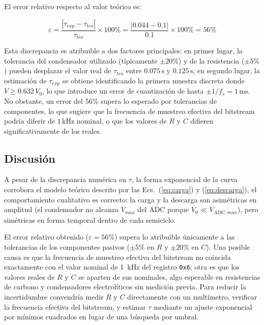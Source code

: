 \documentclass[conference]{IEEEtran}
\begin{document}
El error relativo respecto al valor teórico es:

\begin{equation}
    \varepsilon = \frac{|\tau_{exp} - \tau_{teo}|}{\tau_{teo}} \times 100\%
                = \frac{|0.044 - 0.1|}{0.1} \times 100\% = 56\%
    \label{eq:error}
\end{equation}

Esta discrepancia es atribuible a dos factores principales: en primer
lugar, la tolerancia del condensador utilizado
(típicamente $\pm20\%$) y de la resistencia ($\pm5\%$) pueden desplazar
el valor real de $\tau_{teo}$ entre $0.075\,\text{s}$ y $0.125\,\text{s}$;
en segundo lugar, la estimación de $\tau_{exp}$ se obtiene identificando
la primera muestra discreta donde $V \geq 0.632\,V_0$, lo que introduce
un error de cuantización de hasta $\pm 1/f_s = 1\,\text{ms}$. No
obstante, un error del 56\% supera lo esperado por tolerancias de
componentes, lo que sugiere que la frecuencia de muestreo efectiva del
bitstream podría diferir de $1\,\text{kHz}$ nominal, o que los valores de $R$ y $C$ difieren significativamente de los reales.

\subsection{Discusión}

A pesar de la discrepancia numérica en $\tau$, la forma exponencial de la
curva corrobora el modelo teórico descrito por las Ecs.~(\ref{eq:carga})
y (\ref{eq:descarga}), el comportamiento cualitativo es correcto: la carga
y la descarga son asimétricas en amplitud (el condensador no alcanza
$V_{max}$ del ADC porque $V_0 \ll V_{ADC,max}$), pero simétricas en forma
temporal dentro de cada semiciclo.

El error relativo obtenido ($\varepsilon = 56\%$) supera lo atribuible
únicamente a las tolerancias de los componentes pasivos ($\pm5\%$ en $R$
y $\pm20\%$ en $C$). Una posible causa es que la frecuencia de muestreo
efectiva del bitstream no coincida exactamente con el valor nominal de
1~kHz del registro \texttt{0x6}; otra es que los valores reales de $R$ y
$C$ se aparten de sus nominales, algo esperable en resistencias de carbono
y condensadores electrolíticos sin medición previa. Para reducir la
incertidumbre convendría medir $R$ y $C$ directamente con un multímetro,
verificar la frecuencia efectiva del bitstream, y estimar $\tau$ mediante
un ajuste exponencial por mínimos cuadrados en lugar de una búsqueda por
umbral.
\end{document}
